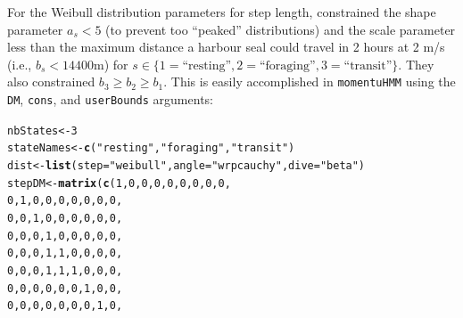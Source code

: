 \documentclass[12pt]{article}\usepackage[]{graphicx}\usepackage[]{color}
\makeatletter
\newcommand{\hlnum}[1]{\textcolor[rgb]{0.686,0.059,0.569}{#1}}%
\newcommand{\hlstr}[1]{\textcolor[rgb]{0.192,0.494,0.8}{#1}}%
\newcommand{\hlstd}[1]{\textcolor[rgb]{0.345,0.345,0.345}{#1}}%
\newcommand{\hlkwb}[1]{\textcolor[rgb]{0.69,0.353,0.396}{#1}}%
\newcommand{\hlkwc}[1]{\textcolor[rgb]{0.333,0.667,0.333}{#1}}%
\newcommand{\hlkwd}[1]{\textcolor[rgb]{0.737,0.353,0.396}{\textbf{#1}}}%
\newenvironment{kframe}{%
 \def\at@end@of@kframe{}%
 \ifinner\ifhmode%
  \def\at@end@of@kframe{\end{minipage}}%
  \begin{minipage}{\columnwidth}%
 \fi\fi%
 \def\FrameCommand##1{\hskip\@totalleftmargin \hskip-\fboxsep
 \colorbox{shadecolor}{##1}\hskip-\fboxsep
     \hskip-\linewidth \hskip-\@totalleftmargin \hskip\columnwidth}%
 \MakeFramed {\advance\hsize-\width
   \@totalleftmargin\z@ \linewidth\hsize
   \@setminipage}}%
 {\par\unskip\endMakeFramed%
 \at@end@of@kframe}
\newenvironment{knitrout}{}{} %
\makeatother
\begin{document}
For the Weibull distribution parameters for step length, \cite{McClintockEtAl2013c} constrained the shape parameter $a_s<5$ (to prevent too ``peaked'' distributions) and the scale parameter less than the maximum distance a harbour seal could travel in 2 hours at 2 m/s (i.e., $b_s<14400$m) for $s \in \{1=\text{``resting''},2=\text{``foraging''},3=\text{``transit''} \}$. They also constrained $b_3\ge b_2 \ge b_1$.  This is easily accomplished in \verb|momentuHMM| using the \verb|DM|, \verb|cons|, and \verb|userBounds| arguments:
\begin{knitrout}
\color{fgcolor}\begin{kframe}
\begin{alltt}
\hlstd{nbStates} \hlkwb{<-} \hlnum{3}
\hlstd{stateNames} \hlkwb{<-} \hlkwd{c}\hlstd{(}\hlstr{"resting"}\hlstd{,} \hlstr{"foraging"}\hlstd{,} \hlstr{"transit"}\hlstd{)}
\hlstd{dist} \hlkwb{<-} \hlkwd{list}\hlstd{(}\hlkwc{step} \hlstd{=} \hlstr{"weibull"}\hlstd{,} \hlkwc{angle} \hlstd{=} \hlstr{"wrpcauchy"}\hlstd{,} \hlkwc{dive} \hlstd{=} \hlstr{"beta"}\hlstd{)}
\hlstd{stepDM}\hlkwb{<-}\hlkwd{matrix}\hlstd{(}\hlkwd{c}\hlstd{(}\hlnum{1}\hlstd{,}\hlnum{0}\hlstd{,}\hlnum{0}\hlstd{,}\hlnum{0}\hlstd{,}\hlnum{0}\hlstd{,}\hlnum{0}\hlstd{,}\hlnum{0}\hlstd{,}\hlnum{0}\hlstd{,}\hlnum{0}\hlstd{,}
                 \hlnum{0}\hlstd{,}\hlnum{1}\hlstd{,}\hlnum{0}\hlstd{,}\hlnum{0}\hlstd{,}\hlnum{0}\hlstd{,}\hlnum{0}\hlstd{,}\hlnum{0}\hlstd{,}\hlnum{0}\hlstd{,}\hlnum{0}\hlstd{,}
                 \hlnum{0}\hlstd{,}\hlnum{0}\hlstd{,}\hlnum{1}\hlstd{,}\hlnum{0}\hlstd{,}\hlnum{0}\hlstd{,}\hlnum{0}\hlstd{,}\hlnum{0}\hlstd{,}\hlnum{0}\hlstd{,}\hlnum{0}\hlstd{,}
                 \hlnum{0}\hlstd{,}\hlnum{0}\hlstd{,}\hlnum{0}\hlstd{,}\hlnum{1}\hlstd{,}\hlnum{0}\hlstd{,}\hlnum{0}\hlstd{,}\hlnum{0}\hlstd{,}\hlnum{0}\hlstd{,}\hlnum{0}\hlstd{,}
                 \hlnum{0}\hlstd{,}\hlnum{0}\hlstd{,}\hlnum{0}\hlstd{,}\hlnum{1}\hlstd{,}\hlnum{1}\hlstd{,}\hlnum{0}\hlstd{,}\hlnum{0}\hlstd{,}\hlnum{0}\hlstd{,}\hlnum{0}\hlstd{,}
                 \hlnum{0}\hlstd{,}\hlnum{0}\hlstd{,}\hlnum{0}\hlstd{,}\hlnum{1}\hlstd{,}\hlnum{1}\hlstd{,}\hlnum{1}\hlstd{,}\hlnum{0}\hlstd{,}\hlnum{0}\hlstd{,}\hlnum{0}\hlstd{,}
                 \hlnum{0}\hlstd{,}\hlnum{0}\hlstd{,}\hlnum{0}\hlstd{,}\hlnum{0}\hlstd{,}\hlnum{0}\hlstd{,}\hlnum{0}\hlstd{,}\hlnum{1}\hlstd{,}\hlnum{0}\hlstd{,}\hlnum{0}\hlstd{,}
                 \hlnum{0}\hlstd{,}\hlnum{0}\hlstd{,}\hlnum{0}\hlstd{,}\hlnum{0}\hlstd{,}\hlnum{0}\hlstd{,}\hlnum{0}\hlstd{,}\hlnum{0}\hlstd{,}\hlnum{1}\hlstd{,}\hlnum{0}\hlstd{,}

\end{alltt}
\end{kframe}
\end{knitrout}
\end{document}
